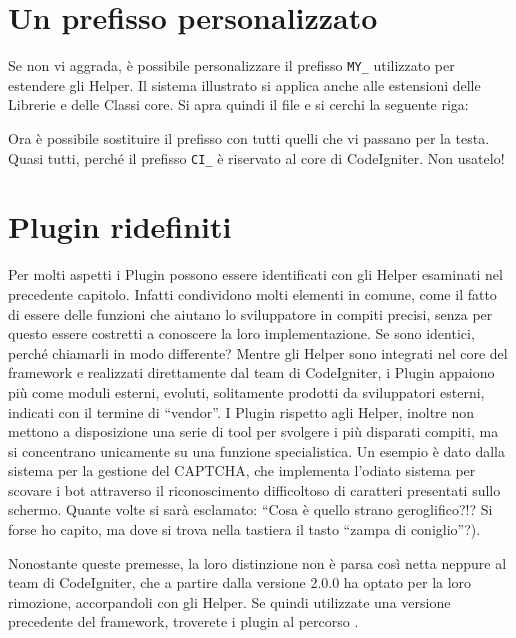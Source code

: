\section*{Un prefisso personalizzato}
Se non vi aggrada, è possibile personalizzare il prefisso \verb|MY_| utilizzato per estendere gli Helper. Il sistema illustrato si applica anche alle estensioni delle Librerie e delle Classi core. Si apra quindi il file  e si cerchi la seguente riga:


Ora è possibile sostituire il prefisso con tutti quelli che vi passano per la testa. Quasi tutti, perché il prefisso \verb|CI_| è riservato al core di CodeIgniter. Non usatelo!

\label{cap:plugin}
\section{Plugin ridefiniti}
Per molti aspetti i Plugin possono essere identificati con gli Helper esaminati nel precedente capitolo. Infatti condividono molti elementi in comune, come il fatto di essere delle funzioni che aiutano lo sviluppatore in compiti precisi, senza per questo essere costretti a conoscere la loro implementazione. Se sono identici, perché chiamarli in modo differente? Mentre gli Helper sono integrati nel core del framework e realizzati direttamente dal team di CodeIgniter, i Plugin appaiono più come moduli esterni, evoluti, solitamente  prodotti da sviluppatori esterni, indicati con il termine di ``vendor''. I Plugin rispetto agli Helper, inoltre non mettono a disposizione una serie di tool per svolgere i più disparati compiti, ma si concentrano unicamente su una funzione specialistica. Un esempio è dato dalla sistema per la gestione del \ac{CAPTCHA}, che implementa l'odiato sistema per scovare i bot attraverso il riconoscimento difficoltoso di caratteri presentati sullo schermo. Quante volte si sarà esclamato: ``Cosa è quello strano geroglifico?!? Si forse ho capito, ma dove si trova nella tastiera il tasto ``zampa di coniglio''?).

Nonostante queste premesse, la loro distinzione non è parsa così netta neppure al team di CodeIgniter, che a partire dalla versione 2.0.0 ha optato per la loro rimozione, accorpandoli con gli Helper. Se quindi utilizzate una versione precedente del framework, troverete i plugin al percorso .

